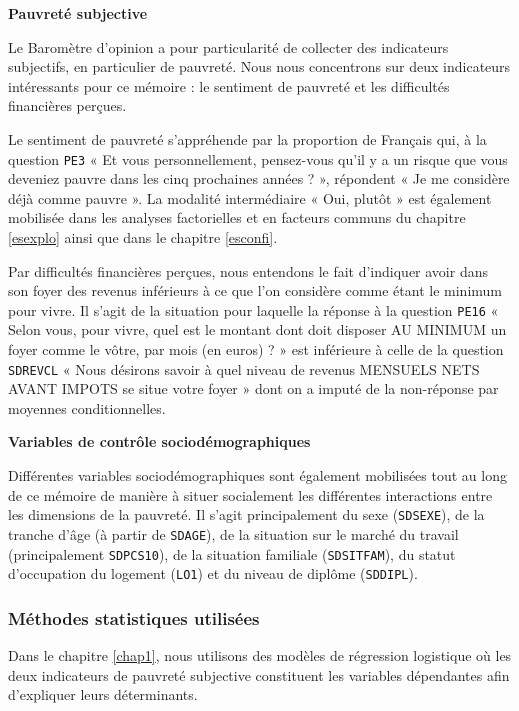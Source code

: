 \documentclass[12pt,a4paper]{reedthesis}
\begin{document}
\textbf{Pauvreté subjective}

Le Baromètre d'opinion a pour particularité de collecter des indicateurs subjectifs, en particulier de pauvreté. Nous nous concentrons sur deux indicateurs intéressants pour ce mémoire : le sentiment de pauvreté et les difficultés financières perçues.

Le sentiment de pauvreté s'appréhende par la proportion de Français qui, à la question \texttt{PE3} « Et vous personnellement, pensez-vous qu'il y a un risque que vous deveniez pauvre dans les cinq prochaines années ? », répondent « Je me considère déjà comme pauvre ». La modalité intermédiaire « Oui, plutôt » est également mobilisée dans les analyses factorielles et en facteurs communs du chapitre \ref{esexplo} ainsi que dans le chapitre \ref{esconfi}.

Par difficultés financières perçues, nous entendons le fait d'indiquer avoir dans son foyer des revenus inférieurs à ce que l'on considère comme étant le minimum pour vivre. Il s'agit de la situation pour laquelle la réponse à la question \texttt{PE16} « Selon vous, pour vivre, quel est le montant dont doit disposer AU MINIMUM un foyer comme le vôtre, par mois (en euros) ? » est inférieure à celle de la question \texttt{SDREVCL} « Nous désirons savoir à quel niveau de revenus MENSUELS NETS AVANT IMPOTS se situe votre foyer » dont on a imputé de la non-réponse par moyennes conditionnelles.

\textbf{Variables de contrôle sociodémographiques}

Différentes variables sociodémographiques sont également mobilisées tout au long de ce mémoire de manière à situer socialement les différentes interactions entre les dimensions de la pauvreté. Il s'agit principalement du sexe (\texttt{SDSEXE}), de la tranche d'âge (à partir de \texttt{SDAGE}), de la situation sur le marché du travail (principalement \texttt{SDPCS10}), de la situation familiale (\texttt{SDSITFAM}), du statut d'occupation du logement (\texttt{LO1}) et du niveau de diplôme (\texttt{SDDIPL}).

\hypertarget{sec:methodes}{%
\subsubsection{Méthodes statistiques utilisées}\label{sec:methodes}}

Dans le chapitre \ref{chap1}, nous utilisons des modèles de régression logistique où les deux indicateurs de pauvreté subjective constituent les variables dépendantes afin d'expliquer leurs déterminants.
\end{document}
